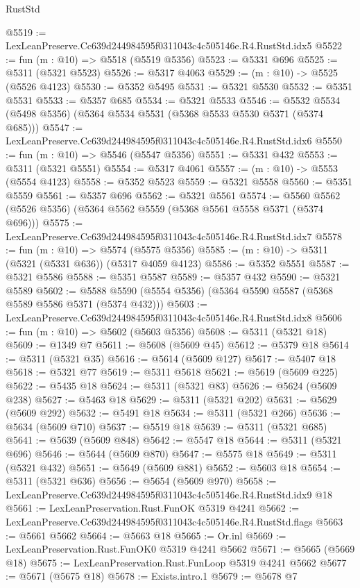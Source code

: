 \begin{lexlean}{RustStd}
\begin{coremodule}
@5519 := LexLeanPreserve.Cc639d244984595f0311043c4c505146e.R4.RustStd.idx5
@5522 := fun (m : @10) => @5518 (@5519 @5356)
@5523 := @5331 @696
@5525 := @5311 (@5321 @5523)
@5526 := @5317 @4063
@5529 := (m : @10) -> @5525 (@5526 @4123)
@5530 := @5352 @5495
@5531 := @5321 @5530
@5532 := @5351 @5531
@5533 := @5357 @685
@5534 := @5321 @5533
@5546 := @5532 @5534 (@5498 @5356) (@5364 @5534 @5531 (@5368 @5533 @5530 @5371 (@5374 @685)))
@5547 := LexLeanPreserve.Cc639d244984595f0311043c4c505146e.R4.RustStd.idx6
@5550 := fun (m : @10) => @5546 (@5547 @5356)
@5551 := @5331 @432
@5553 := @5311 (@5321 @5551)
@5554 := @5317 @4061
@5557 := (m : @10) -> @5553 (@5554 @4123)
@5558 := @5352 @5523
@5559 := @5321 @5558
@5560 := @5351 @5559
@5561 := @5357 @696
@5562 := @5321 @5561
@5574 := @5560 @5562 (@5526 @5356) (@5364 @5562 @5559 (@5368 @5561 @5558 @5371 (@5374 @696)))
@5575 := LexLeanPreserve.Cc639d244984595f0311043c4c505146e.R4.RustStd.idx7
@5578 := fun (m : @10) => @5574 (@5575 @5356)
@5585 := (m : @10) -> @5311 (@5321 (@5331 @636)) (@5317 @4059 @4123)
@5586 := @5352 @5551
@5587 := @5321 @5586
@5588 := @5351 @5587
@5589 := @5357 @432
@5590 := @5321 @5589
@5602 := @5588 @5590 (@5554 @5356) (@5364 @5590 @5587 (@5368 @5589 @5586 @5371 (@5374 @432)))
@5603 := LexLeanPreserve.Cc639d244984595f0311043c4c505146e.R4.RustStd.idx8
@5606 := fun (m : @10) => @5602 (@5603 @5356)
@5608 := @5311 (@5321 @18)
@5609 := @1349 @7
@5611 := @5608 (@5609 @45)
@5612 := @5379 @18
@5614 := @5311 (@5321 @35)
@5616 := @5614 (@5609 @127)
@5617 := @5407 @18
@5618 := @5321 @77
@5619 := @5311 @5618
@5621 := @5619 (@5609 @225)
@5622 := @5435 @18
@5624 := @5311 (@5321 @83)
@5626 := @5624 (@5609 @238)
@5627 := @5463 @18
@5629 := @5311 (@5321 @202)
@5631 := @5629 (@5609 @292)
@5632 := @5491 @18
@5634 := @5311 (@5321 @266)
@5636 := @5634 (@5609 @710)
@5637 := @5519 @18
@5639 := @5311 (@5321 @685)
@5641 := @5639 (@5609 @848)
@5642 := @5547 @18
@5644 := @5311 (@5321 @696)
@5646 := @5644 (@5609 @870)
@5647 := @5575 @18
@5649 := @5311 (@5321 @432)
@5651 := @5649 (@5609 @881)
@5652 := @5603 @18
@5654 := @5311 (@5321 @636)
@5656 := @5654 (@5609 @970)
@5658 := LexLeanPreserve.Cc639d244984595f0311043c4c505146e.R4.RustStd.idx9 @18
@5661 := LexLeanPreservation.Rust.FunOK @5319 @4241
@5662 := LexLeanPreserve.Cc639d244984595f0311043c4c505146e.R4.RustStd.flags
@5663 := @5661 @5662
@5664 := @5663 @18
@5665 := Or.inl
@5669 := LexLeanPreservation.Rust.FunOK0 @5319 @4241 @5662
@5671 := @5665 (@5669 @18)
@5675 := LexLeanPreservation.Rust.FunLoop @5319 @4241 @5662
@5677 := @5671 (@5675 @18)
@5678 := Exists.intro.{1}
@5679 := @5678 @7

\end{coremodule}
\end{lexlean}
